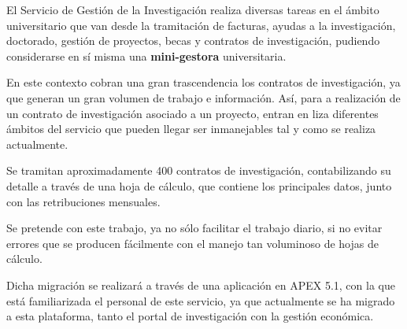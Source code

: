 
El Servicio de Gestión de la Investigación realiza diversas tareas en el ámbito universitario que van desde la tramitación de facturas, ayudas a la investigación, doctorado, gestión de proyectos, becas y contratos de investigación, pudiendo considerarse en sí misma una \textbf{mini-gestora}   universitaria.

En este contexto cobran una gran trascendencia los contratos de investigación, ya que generan un gran volumen de trabajo e información. Así, para a realización de un contrato de investigación asociado a un proyecto, entran en liza diferentes ámbitos del servicio que pueden llegar ser inmanejables tal y como se realiza actualmente.

Se tramitan aproximadamente 400 contratos de investigación, contabilizando su detalle a través de una hoja de cálculo, que contiene los principales datos, junto con las retribuciones mensuales.

Se pretende con este trabajo, ya no sólo facilitar el trabajo diario, si no evitar errores que se producen fácilmente con el manejo tan voluminoso de hojas de cálculo.

Dicha migración se realizará a través de una aplicación en APEX 5.1, con la que está familiarizada el personal de este servicio, ya que actualmente se ha migrado a esta plataforma, tanto el portal de investigación con la gestión económica.